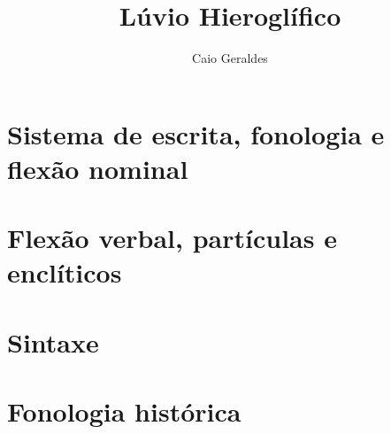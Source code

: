 \documentclass[apostila]{luvita}
\title{Lúvio Hieroglífico}
\author{Caio Geraldes}
\begin{document}
\frontmatter

\thecoverpage%
\cleardoublepage%
\thetitlepage%


\cleardoublepage%


\cleardoublepage%
\tableofcontents*

\cleardoublepage%
\listoffigures*

\mainmatter%




\chapter{Sistema de escrita, fonologia e flexão nominal}


\chapter{Flexão verbal, partículas e enclíticos}


\chapter{Sintaxe}


\chapter{Fonologia histórica}





\backmatter%






%
%



\printbibliography%

\cleardoublepage%

\colofao{}
\end{document}
